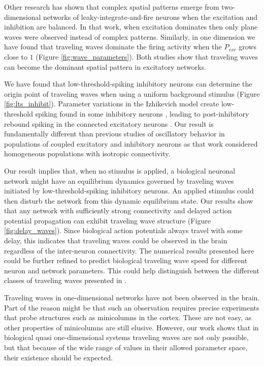 \documentclass[12pt]{article}
\begin{document}
Other research \parencite{keane2015} has shown that complex spatial patterns emerge from two-dimensional networks of leaky-integrate-and-fire neurons when the excitation and inhibition are balanced.
In that work, when excitation dominates then only plane waves were observed instead of complex patterns.
Similarly, in one dimension we have found that traveling waves dominate the firing activity when the $P_{exc}$ grows close to $1$ (Figure \ref{fig:wave_parameters}).
Both studies show that traveling waves can become the dominant spatial pattern in excitatory networks.

We have found that low-threshold-spiking inhibitory neurons can determine the origin point of traveling waves when using a uniform background stimulus (Figure \ref{fig:lts_inhibit}).
Parameter variations in the Izhikevich model \parencite{izhikevich2003} create low-threshold spiking found in some inhibitory neurons \parencite{gibson2009}\parencite{hayut2011}, leading to post-inhibitory rebound spiking in the connected excitatory neurons \parencite{ascoli2010}.
Our result is fundamentally different than previous studies of oscillatory behavior in populations of coupled excitatory and inhibitory neurons \parencite{Golomb1996}\parencite{Golomb1999} as that work considered homogeneous populations with isotropic connectivity.

Our result implies that, when no stimulus is applied, a biological neuronal network might have an equilibrium dynamics governed by traveling waves initiated by low-threshold-spiking inhibitory neurons.
An applied stimulus could then disturb the network from this dynamic equilibrium state.
Our results show  that any network with sufficiently strong connectivity and delayed action potential propagation can exhibit traveling wave structure (Figure \ref{fig:delay_waves}).
Since biological action potentials always travel with some delay, this indicates that traveling waves could be observed in the brain regardless of the inter-neuron connectivity.
The numerical results presented here could be further refined to predict biological traveling wave speed for different neuron and network parameters.
This could help distinguish between the different classes of traveling waves presented in \parencite{ermentrout2001}.

Traveling waves in one-dimensional networks have not been observed in the brain. 
Part of the reason might be that such an observation requires precise experiments that probe structures such as minicolumns in the cortex. 
These are not easy, as other properties of minicolumns are still elusive. 
However, our work shows that in biological quasi one-dimensional systems  traveling waves are not only possible, but that because of the wide range of values in their allowed parameter space, their existence should be expected.


\clearpage
\printbibliography
\end{document}

